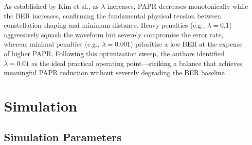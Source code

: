 \begin{enumerate}
          As established by Kim et al., as $\lambda$ increases, PAPR decreases monotonically while the BER increases, confirming the fundamental physical tension between constellation shaping and minimum distance. Heavy penalties (e.g., $\lambda = 0.1$) aggressively squash the waveform but severely compromise the error rate, whereas minimal penalties (e.g., $\lambda = 0.001$) prioritize a low BER at the expense of higher PAPR. Following this optimization sweep, the authors identified $\lambda = 0.01$ as the ideal practical operating point—striking a balance that achieves meaningful PAPR reduction without severely degrading the BER baseline~\cite{kim2017novel}.
\end{enumerate}

\newpage
\section{Simulation}
\label{sec:simulation}

\subsection{Simulation Parameters}

